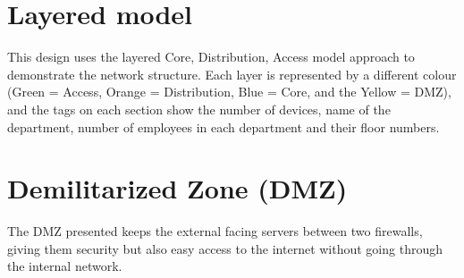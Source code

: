 \documentclass[12pt,oneside]{book}
\begin{document}


\setcounter{page}{2}

\setcounter{page}{2} %
\setcounter{tocdepth}{1}
\tableofcontents
\clearpage


\setcounter{page}{1} %











\clearpage

\printbibliography


\begin{appendices}
\chapter{Layered model}
\label{appendix:layered-model}
This design uses the layered Core, Distribution, Access model approach to demonstrate the network structure. Each layer is represented by a different colour (Green = Access, Orange = Distribution, Blue = Core, and the Yellow = DMZ), and the tags on each section show the number of devices, name of the department, number of employees in each department and their floor numbers.
\chapter{Demilitarized Zone (DMZ)}
\label{appendix:dmz}
The DMZ presented keeps the external facing servers between two firewalls, giving them security but also easy access to the internet without going through the internal network.
\end{appendices}
\end{document}
